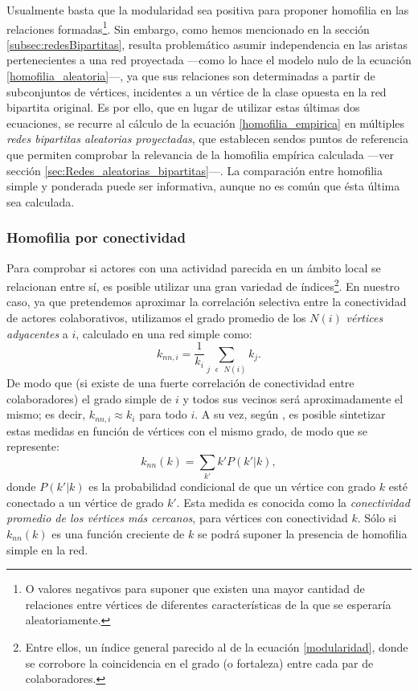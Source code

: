 \documentclass[letterpaper, 11pt]{book}
\theoremstyle{definition}
\theoremstyle{remark}
\begin{document}
Usualmente basta que la modularidad sea positiva para proponer homofilia en las relaciones formadas\footnote{
    O valores negativos para suponer que existen una mayor cantidad de relaciones entre vértices de diferentes características de la que se esperaría aleatoriamente.
}. 
Sin embargo, como hemos mencionado en la sección \ref{subsec:redesBipartitas}, resulta problemático asumir independencia en las aristas pertenecientes a una red proyectada ---como lo hace el modelo nulo de la ecuación \ref{homofilia_aleatoria}---, ya que sus relaciones son determinadas a partir de subconjuntos de vértices, incidentes a un vértice de la clase opuesta en la red bipartita original. 
Es por ello, que en lugar de utilizar estas últimas dos ecuaciones, se recurre al cálculo de la ecuación \ref{homofilia_empirica} en múltiples \emph{redes bipartitas aleatorias proyectadas}, que establecen sendos puntos de referencia que permiten comprobar la relevancia de la homofilia empírica calculada ---ver sección \ref{sec:Redes_aleatorias_bipartitas}---. 
La comparación entre homofilia simple y ponderada puede ser informativa, aunque no es común que ésta última sea calculada. 




\subsubsection{Homofilia por conectividad}
\label{subsec:HomofilidadConectividad}

Para comprobar si actores con una actividad parecida en un ámbito local se relacionan entre sí, es posible utilizar una gran variedad de índices\footnote{
    Entre ellos, un índice general parecido al de la ecuación \ref{modularidad}, donde se corrobore la coincidencia en el grado (o fortaleza) entre cada par de colaboradores. 
}. 
En nuestro caso, ya que pretendemos aproximar la correlación selectiva entre la conectividad de actores colaborativos, utilizamos el grado promedio de los $N(i)$ \emph{vértices adyacentes} a $i$, calculado en una red simple como: 
\begin{equation}\label{homofilia_k}
    k_{nn , i} = \frac{1}{k_{i}} \sum_{j \text{ } \epsilon \text{ } N(i)} k_{j}.
\end{equation} 
De modo que (si existe de una fuerte correlación de conectividad entre colaboradores) el grado simple de $i$ y todos sus vecinos será aproximadamente el mismo; es decir, $k_{nn , i} \approx k_i$ para todo $i$. 
A su vez, según \citet{2004_Barrat_ComplexNetworks}, es posible sintetizar estas medidas en función de vértices con el mismo grado, de modo que se represente:
\begin{equation}\label{knn}
    k_{nn}(k) = \sum_{k'}k'P(k'|k),
\end{equation} 
donde $P(k'|k)$ es la probabilidad condicional de que un vértice con grado $k$ esté conectado a un vértice de grado $k'$. 
Esta medida es conocida como la \emph{conectividad promedio de los vértices más cercanos}, para vértices con conectividad $k$. 
Sólo si $k_{nn}(k)$ es una función creciente de $k$ se podrá suponer la presencia de homofilia simple en la red. 
\end{document}
